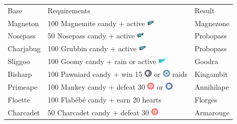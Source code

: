 \begin{table}
\footnotesize
\centering
\begin{tabular}{lll}
  Base & Requirements & Result \\
  \Midrule
  Magneton & 100 Magnemite candy + active \includegraphics[width=1em,height=1em]{images/magneticlure.png} & Magnezone\\
  Nosepass & 50 Nosepass candy + active \includegraphics[width=1em,height=1em]{images/magneticlure.png} & Probopass\\
  Charjabug & 100 Grubbin candy + active \includegraphics[width=1em,height=1em]{images/magneticlure.png} & Probopass\\
  Sliggoo	& 100 Goomy candy + rain or active \includegraphics[width=1em,height=1em]{images/rainylure.png}& Goodra\\
  Bisharp	& 100 Pawniard candy + win 15 \includegraphics[width=1em,height=1em]{images/dark.png} or \includegraphics[width=1em,height=1em]{images/steel.png} raids & Kingambit\\
  Primeape & 100 Mankey candy + defeat 30 \includegraphics[width=1em,height=1em]{images/psychic.png} or \includegraphics[width=1em,height=1em]{images/ghost.png} & Annihilape\\
  Floette	& 100 Flabébé candy + earn 20 hearts & Florges\\
  Charcadet	& 50 Charcadet candy + defeat 30 \includegraphics[width=1em,height=1em]{images/psychic.png}& Armarouge\\

\end{tabular}
\end{table}
